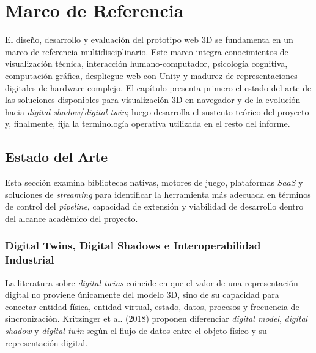 
\section{Marco de Referencia}

El diseño, desarrollo y evaluación del prototipo web 3D se fundamenta en un marco de referencia multidisciplinario. Este marco integra conocimientos de visualización técnica, interacción humano-computador, psicología cognitiva, computación gráfica, despliegue web con Unity y madurez de representaciones digitales de hardware complejo. El capítulo presenta primero el estado del arte de las soluciones disponibles para visualización 3D en navegador y de la evolución hacia \textit{digital shadow}/\textit{digital twin}; luego desarrolla el sustento teórico del proyecto y, finalmente, fija la terminología operativa utilizada en el resto del informe.

\subsection{Estado del Arte}

Esta sección examina bibliotecas nativas, motores de juego, plataformas \textit{SaaS} y soluciones de \textit{streaming} para identificar la herramienta más adecuada en términos de control del \textit{pipeline}, capacidad de extensión y viabilidad de desarrollo dentro del alcance académico del proyecto.

\subsubsection{Digital Twins, Digital Shadows e Interoperabilidad Industrial}

La literatura sobre \textit{digital twins} coincide en que el valor de una representación digital no proviene únicamente del modelo 3D, sino de su capacidad para conectar entidad física, entidad virtual, estado, datos, procesos y frecuencia de sincronización. Kritzinger et al. (2018) proponen diferenciar \textit{digital model}, \textit{digital shadow} y \textit{digital twin} según el flujo de datos entre el objeto físico y su representación digital.

